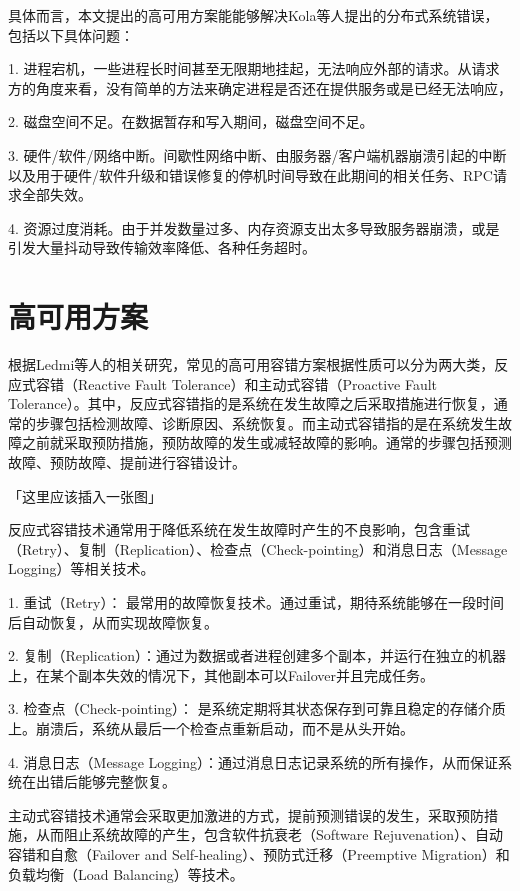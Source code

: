 具体而言，本文提出的高可用方案能能够解决Kola\cite{kola2005faults}等人提出的分布式系统错误，包括以下具体问题：

1. 进程宕机，一些进程长时间甚至无限期地挂起，无法响应外部的请求。从请求方的角度来看，没有简单的方法来确定进程是否还在提供服务或是已经无法响应，

2. 磁盘空间不足。在数据暂存和写入期间，磁盘空间不足。

3. 硬件/软件/网络中断。间歇性网络中断、由服务器/客户端机器崩溃引起的中断以及用于硬件/软件升级和错误修复的停机时间导致在此期间的相关任务、RPC请求全部失效。

4. 资源过度消耗。由于并发数量过多、内存资源支出太多导致服务器崩溃，或是引发大量抖动导致传输效率降低、各种任务超时。


\section{高可用方案}

根据Ledmi\cite{ledmi2018fault}等人的相关研究，常见的高可用容错方案根据性质可以分为两大类，反应式容错（Reactive Fault Tolerance）和主动式容错（Proactive Fault Tolerance）。其中，反应式容错指的是系统在发生故障之后采取措施进行恢复，通常的步骤包括检测故障、诊断原因、系统恢复。而主动式容错指的是在系统发生故障之前就采取预防措施，预防故障的发生或减轻故障的影响。通常的步骤包括预测故障、预防故障、提前进行容错设计。

「这里应该插入一张图」

反应式容错技术通常用于降低系统在发生故障时产生的不良影响，包含重试（Retry）、复制（Replication）、检查点（Check-pointing）和消息日志（Message Logging）等相关技术。

1. 重试（Retry）： 最常用的故障恢复技术。通过重试，期待系统能够在一段时间后自动恢复，从而实现故障恢复。

2. 复制（Replication）：通过为数据或者进程创建多个副本，并运行在独立的机器上，在某个副本失效的情况下，其他副本可以Failover并且完成任务。

3. 检查点（Check-pointing）： 是系统定期将其状态保存到可靠且稳定的存储介质上。崩溃后，系统从最后一个检查点重新启动，而不是从头开始。

4. 消息日志（Message Logging）：通过消息日志记录系统的所有操作，从而保证系统在出错后能够完整恢复。

主动式容错技术通常会采取更加激进的方式，提前预测错误的发生，采取预防措施，从而阻止系统故障的产生，包含软件抗衰老（Software Rejuvenation）、自动容错和自愈（Failover and Self-healing）、预防式迁移（Preemptive Migration）和负载均衡（Load Balancing）等技术。

